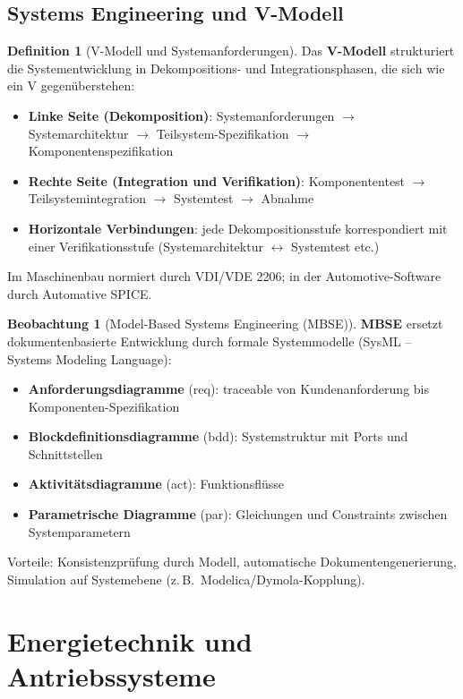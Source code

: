 ﻿\documentclass[a4paper,12pt]{report}
\theoremstyle{definition}
\newtheorem{definition}{Definition}
\newtheorem{beobachtung}{Beobachtung}
\begin{document}
\section{Systems Engineering und V-Modell}

\begin{definition}[V-Modell und Systemanforderungen]
Das \textbf{V-Modell} strukturiert die Systementwicklung in Dekompositions-
und Integrationsphasen, die sich wie ein V gegenüberstehen:
\begin{itemize}
    \item[-] \textbf{Linke Seite (Dekomposition)}: Systemanforderungen
          $\to$ Systemarchitektur $\to$ Teilsystem-Spezifikation $\to$ Komponentenspezifikation
    \item[-] \textbf{Rechte Seite (Integration und Verifikation)}: Komponententest
          $\to$ Teilsystemintegration $\to$ Systemtest $\to$ Abnahme
    \item[-] \textbf{Horizontale Verbindungen}: jede Dekompositionsstufe
          korrespondiert mit einer Verifikationsstufe
          (Systemarchitektur $\leftrightarrow$ Systemtest etc.)
\end{itemize}
Im Maschinenbau normiert durch VDI/VDE 2206;
in der Automotive-Software durch Automative SPICE.
\end{definition}

\begin{beobachtung}[Model-Based Systems Engineering (MBSE)]
\textbf{MBSE} ersetzt dokumentenbasierte Entwicklung durch
formale Systemmodelle (SysML -- Systems Modeling Language):
\begin{itemize}
    \item[-] \textbf{Anforderungsdiagramme} (req): traceable von Kundenanforderung
          bis Komponenten-Spezifikation
    \item[-] \textbf{Blockdefinitionsdiagramme} (bdd): Systemstruktur mit
          Ports und Schnittstellen
    \item[-] \textbf{Aktivitätsdiagramme} (act): Funktionsflüsse
    \item[-] \textbf{Parametrische Diagramme} (par): Gleichungen und
          Constraints zwischen Systemparametern
\end{itemize}
Vorteile: Konsistenzprüfung durch Modell, automatische Dokumentengenerierung,
Simulation auf Systemebene (z.\,B.\ Modelica/Dymola-Kopplung).
\end{beobachtung}

\chapter{Energietechnik und Antriebssysteme}
\end{document}
